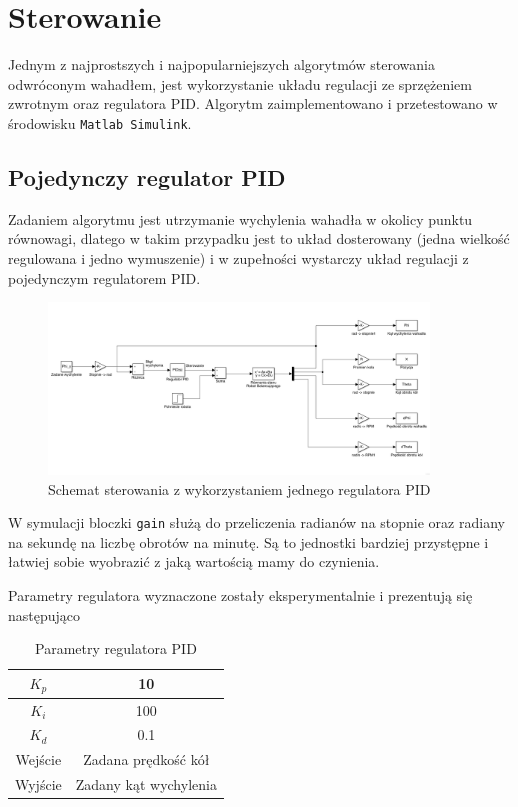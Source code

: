 \newpage

\section{Sterowanie}
\label{Sterowanie podrozdzial}
Jednym z najprostszych i najpopularniejszych algorytmów sterowania odwróconym wahadłem, jest wykorzystanie układu regulacji ze sprzężeniem zwrotnym oraz regulatora PID. Algorytm zaimplementowano i przetestowano w środowisku \texttt{Matlab Simulink}.

\subsection{Pojedynczy regulator PID}
Zadaniem algorytmu jest utrzymanie wychylenia wahadła w okolicy punktu równowagi, dlatego w takim przypadku jest to układ dosterowany (jedna wielkość regulowana i jedno wymuszenie) i w zupełności wystarczy układ regulacji z pojedynczym regulatorem PID.
\begin{figure}[h!]
    \centering
	\includegraphics[width=0.9\textwidth]{Rysunki/Rozdzial02/Pojedynczy_PID.png}
	\caption{Schemat sterowania z wykorzystaniem jednego regulatora PID}
\end{figure}

W symulacji bloczki \texttt{gain} służą do przeliczenia radianów na stopnie oraz radiany na sekundę na liczbę obrotów na minutę. Są to jednostki bardziej przystępne i łatwiej sobie wyobrazić z jaką wartością mamy do czynienia.

Parametry regulatora wyznaczone zostały eksperymentalnie i prezentują się następująco
\begin{table}[h!]
    \centering
    \begin{tabular}{|c|c|}
        \hline
        $K_p$ & 10 \\
        \hline
        $K_i$ & 100 \\
        \hline
        $K_d$ & 0.1 \\
        \hline
        Wejście & Zadana prędkość kół \\
        \hline
        Wyjście & Zadany kąt wychylenia \\
        \hline
    \end{tabular}
        
    \caption{Parametry regulatora PID}
    \label{Parametry PID}
\end{table}

